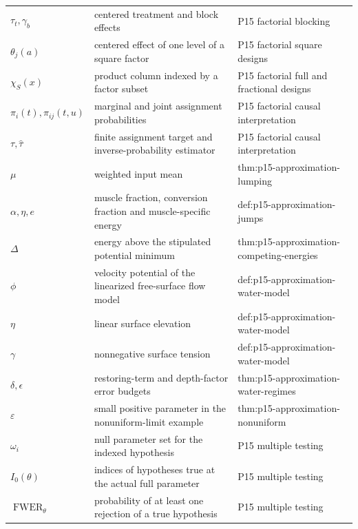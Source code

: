 \begin{longtable}{@{}p{}p{}p{}@{}}
\(\tau_t,\allowbreak \gamma_b\) & centered treatment and block effects & P15 factorial blocking \\
\(\theta_j(a)\) & centered effect of one level of a square factor & P15 factorial square designs \\
\(\chi_S(x)\) & product column indexed by a factor subset & P15 factorial full and fractional designs \\
\(\pi_i(t),\allowbreak \pi_{ij}(t,\allowbreak u)\) & marginal and joint assignment probabilities & P15 factorial causal interpretation \\
\(\tau,\allowbreak \widehat\tau\) & finite assignment target and inverse-probability estimator & P15 factorial causal interpretation \\
\(\mu\) & weighted input mean & thm:\allowbreak{}p15-\allowbreak{}approximation-\allowbreak{}lumping \\
\(\alpha,\allowbreak \eta,\allowbreak e\) & muscle fraction, conversion fraction and muscle-specific energy & def:\allowbreak{}p15-\allowbreak{}approximation-\allowbreak{}jumps \\
\(\Delta\) & energy above the stipulated potential minimum & thm:\allowbreak{}p15-\allowbreak{}approximation-\allowbreak{}competing-\allowbreak{}energies \\
\(\phi\) & velocity potential of the linearized free-surface flow model & def:\allowbreak{}p15-\allowbreak{}approximation-\allowbreak{}water-\allowbreak{}model \\
\(\eta\) & linear surface elevation & def:\allowbreak{}p15-\allowbreak{}approximation-\allowbreak{}water-\allowbreak{}model \\
\(\gamma\) & nonnegative surface tension & def:\allowbreak{}p15-\allowbreak{}approximation-\allowbreak{}water-\allowbreak{}model \\
\(\delta,\allowbreak \epsilon\) & restoring-term and depth-factor error budgets & thm:\allowbreak{}p15-\allowbreak{}approximation-\allowbreak{}water-\allowbreak{}regimes \\
\(\varepsilon\) & small positive parameter in the nonuniform-limit example & thm:\allowbreak{}p15-\allowbreak{}approximation-\allowbreak{}nonuniform \\
\(\omega_i\) & null parameter set for the indexed hypothesis & P15 multiple testing \\
\(I_0(\theta)\) & indices of hypotheses true at the actual full parameter & P15 multiple testing \\
\(\operatorname{FWER}_\theta\) & probability of at least one rejection of a true hypothesis & P15 multiple testing \\

\end{longtable}
